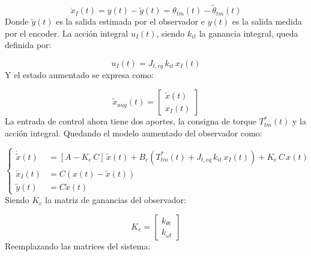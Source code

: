 \[
    \dot{x}_I(t) = y(t) - \tilde{y}(t) = \theta_{tm}(t) - \tilde{\theta}_{tm}(t)
\]
Donde $\tilde{y}(t)$ es la salida estimada por el observador e $y(t)$ es la salida medida por el encoder. 
La acción integral $u_I(t)$, siendo $k_{it}$ la ganancia integral, queda definida por:

\[
    u_I(t) = J_{t,eq}\, k_{it}\, x_I(t)
\]
Y el estado aumentado se expresa como:

\[
    \tilde{x}_{aug}(t) = \begin{bmatrix} \tilde{x}(t) \\ x_I(t) \end{bmatrix}
\]
La entrada de control ahora tiene dos aportes, la consigna de torque $T_{tm}^\ast(t)$ y la acción integral. Quedando el modelo aumentado del observador como:

\begin{equation}
\left\{
\begin{aligned}
    \dot{\tilde{x}}(t) &= [A - K_e \, C]\, \tilde{x}(t) + B_c \left( T_{tm}^\ast(t) + J_{t,eq}\, k_{it}\, x_I(t) \right) + K_e\, C\,  x(t) \\
    \dot{x}_I(t) &= C  (x(t) - \tilde{x}(t)) \\
    \tilde{y}(t) &= C \tilde{x}(t)
\end{aligned}
\right.
\end{equation}
Siendo $K_e$ la matriz de ganancias del observador:

\[
    K_e = \begin{bmatrix} k_{\theta t} \\ k_{\omega t} \end{bmatrix}
\]
Reemplazando las matrices del sistema:

